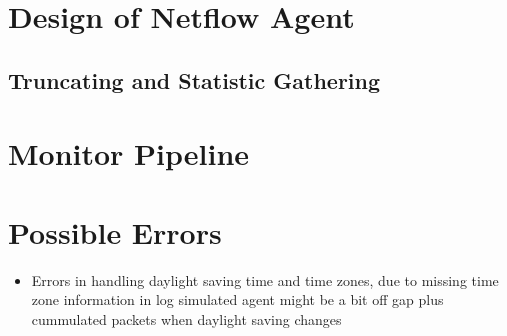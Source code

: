 
\section{Design of Netflow Agent}
	\subsection{Truncating and Statistic Gathering}

\section{Monitor Pipeline}

\section{Possible Errors}
\begin{itemize}
	\item Errors in handling daylight saving time and time zones, due to missing time zone information in log
		\subitem simulated agent might be a bit off
		\subitem gap plus cummulated packets when daylight saving changes
\end{itemize}
